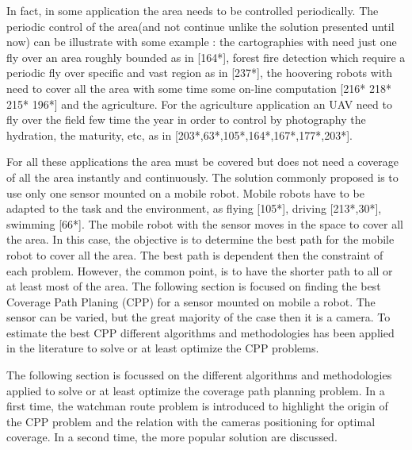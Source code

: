 In fact, in some application the area needs to be controlled periodically. The periodic control  of the area(and not continue unlike the solution presented until now) can be illustrate with some example :  the cartographies with need just one fly over an area roughly bounded as in \citep{66*galceran2013} [164*], forest fire detection which require a periodic fly over specific and vast region as in [237*], the hoovering robots with need to cover all the area with some time some on-line computation [216* 218* 215* 196*] and the agriculture. For the agriculture application an UAV need to fly over the field few time the year in order to control by photography the hydration, the maturity, etc, as in [203*,63*,105*,164*,167*,177*,203*]. %

For all these applications the area must be covered but does not need a coverage of all the area instantly and continuously. The solution commonly proposed is to use only one sensor mounted on a mobile robot. Mobile robots have to be adapted to the task and the environment, as flying [105*], driving [213*,30*], swimming [66*]. The mobile robot with the sensor moves in the space to cover all the area. In this case, the objective is to determine the best path for the mobile robot to cover all the area. The best path is dependent then the constraint of each problem. However, the common point, is to have the shorter path to all or at least most of the area.
The following section is focused on finding the best Coverage Path Planing (CPP) for a sensor mounted on mobile a robot. The sensor can be varied, but  the great majority of the case then it is a camera. To estimate the best CPP different algorithms and methodologies has been applied in the literature to solve or at least optimize the CPP problems.

  The following section is focussed on the different algorithms and methodologies applied to solve or at least optimize the coverage path planning problem. In a first time, the watchman route problem is introduced to highlight the origin of the CPP problem and the relation with the cameras positioning for optimal coverage. In a second time, the more popular solution are discussed.
 





%
%





